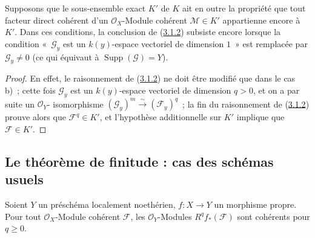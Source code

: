 \begin{corollary}[3.1.3]
\label{III.3.1.3-fr}
Supposons que le sous-ensemble exact $K'$ de $K$ ait en outre la propriété
que tout facteur direct cohérent d'un $\mathcal O_X$-Module cohérent
$\mathcal M\in K'$ appartienne encore à $K'$. Dans ces conditions, la
conclusion de (\hyperref[III.3.1.2-fr]{3.1.2}) subsiste encore lorsque la
condition «~$\mathcal G_y$ est un $k(y)$-espace vectoriel de dimension $1$~»
est remplacée par $\mathcal G_y\neq0$ (ce qui équivaut à
$\operatorname{Supp}(\mathcal G)=Y$).
\end{corollary}

\begin{proof}
En effet, le raisonnement de (\hyperref[III.3.1.2-fr]{3.1.2}) ne doit être
modifié que dans le cas b)~; cette fois $\mathcal G_y$ est un $k(y)$-espace
vectoriel de dimension $q>0$, et on a par suite un $\mathcal O_Y$-
isomorphisme $(\mathcal G_y)^m\xrightarrow{\sim}(\mathcal F_y)^q$~; la fin
du raisonnement de (\hyperref[III.3.1.2-fr]{3.1.2}) prouve alors que
$\mathcal F^q\in K'$, et l'hypothèse additionnelle sur $K'$ implique que
$\mathcal F\in K'$.
\end{proof}

\subsection{Le théorème de finitude : cas des schémas usuels}
\label{subsection:III.3.2-fr}

\begin{theorem}[3.2.1]
\label{III.3.2.1-fr}
Soient $Y$ un préschéma localement noethérien, $f:X\to Y$ un morphisme
propre. Pour tout $\mathcal O_X$-Module cohérent $\mathcal F$, les
$\mathcal O_Y$-Modules $R^qf_*(\mathcal F)$ sont cohérents pour $q\geq0$.
\end{theorem}

